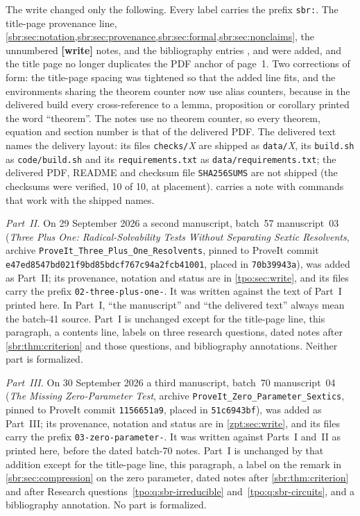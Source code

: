 \documentclass[11pt,letterpaper]{article}
\numberwithin{equation}{section}
\theoremstyle{definition}
\theoremstyle{remark}
\newcommand{\src}[1]{\texttt{\nolinkurl{#1}}}
\newcommand{\tpopin}{\texttt{e47ed8547bd021f9bd85bdcf767c94a2fcb41001}}
\begin{document}
The write changed only the following. Every label carries the prefix
\src{sbr:}. The title-page provenance line,
\cref{sbr:sec:notation,sbr:sec:provenance,sbr:sec:formal,sbr:sec:nonclaims},
the unnumbered \textbf{[write]} notes, and the bibliography entries
\cite{repo-separating-search}, \cite{repo-sparse-search} and \cite{rss}
were added, and the title page no longer duplicates the PDF anchor of
page~1. Two corrections of form: the title-page spacing was tightened so
that the added line fits, and the environments sharing the theorem
counter now use alias counters, because in the delivered build every
cross-reference to a lemma, proposition or corollary printed the
word ``theorem''. The notes use no theorem counter, so every theorem, equation and
section number is that of the delivered PDF. The delivered text names the
delivery layout: its files \src{checks/}\emph{X} are shipped as
\src{data/}\emph{X}, its \src{build.sh} as \src{code/build.sh} and its
\src{requirements.txt} as \src{data/requirements.txt}; the delivered PDF,
README and checksum file \src{SHA256SUMS} are not shipped (the checksums
were verified, 10 of 10, at placement).  carries a
note with commands that work with the shipped names.

\emph{Part~II.} On 29 September 2026 a second manuscript, batch~57
manuscript~03 (\emph{Three Plus One: Radical-Solvability Tests Without
Separating Sextic Resolvents}, archive
\src{ProveIt_Three_Plus_One_Resolvents}, pinned to ProveIt commit
\tpopin, placed in \src{70b39943a}), was added as Part~II; its provenance,
notation and status are in \cref{tpo:sec:write}, and its files carry the
prefix \src{02-three-plus-one-}. It was written against the text of Part~I
printed here. In Part~I, ``the manuscript'' and ``the delivered text''
always mean the batch-41 source. Part~I is unchanged except for the
title-page line, this paragraph, a contents line, labels on three research
questions, dated notes after \cref{sbr:thm:criterion} and those questions,
and bibliography annotations. Neither part is formalized.

\emph{Part~III.} On 30 September 2026 a third manuscript, batch~70
manuscript~04 (\emph{The Missing Zero-Parameter Test}, archive
\src{ProveIt_Zero_Parameter_Sextics}, pinned to ProveIt commit \src{1156651a9},
placed in \src{51c6943bf}), was added as Part~III; its provenance, notation
and status are in \cref{zpt:sec:write}, and its files carry the prefix
\src{03-zero-parameter-}. It was written against Parts~I and~II as printed
here, before the dated batch-70 notes. Part~I is unchanged by that addition
except for the title-page line, this paragraph, a label on the remark in
\cref{sbr:sec:compression} on the zero parameter, dated notes after
\cref{sbr:thm:criterion} and after Research
questions~\ref{tpo:q:sbr-irreducible} and~\ref{tpo:q:sbr-circuits}, and a
bibliography annotation. No part is formalized.
\end{document}
